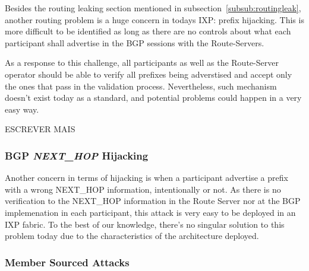 \documentclass[12pt]{article}
\begin{document}

Besides the routing leaking section mentioned in subsection~\ref{subsub:routingleak}, another routing problem is a huge concern in todays IXP: prefix hijacking. This is more difficult to be identified as long as there are no controls about what each participant shall advertise in the BGP sessions with the Route-Servers. 

As a response to this challenge, all participants as well as the Route-Server operator should be able to verify all prefixes being adverstised and accept only the ones that pass in the validation process. Nevertheless, such mechanism doesn't exist today as a standard, and potential problems could happen in a very easy way.

ESCREVER MAIS

\subsubsection{BGP \textit{NEXT\_HOP} Hijacking}

Another concern in terms of hijacking is when a participant advertise a prefix with a wrong NEXT\_HOP information, intentionally or not. As there is no verification to the NEXT\_HOP information in the Route Server nor at the BGP implemenation in each participant, this attack is very easy to be deployed in an IXP fabric. To the best of our knowledge, there's no singular solution to this problem today due to the characteristics of the architecture deployed.

\subsubsection{Member Sourced Attacks}
\end{document}
